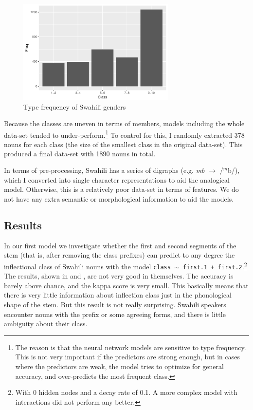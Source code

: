 \begin{figure}
  \centering
  \includegraphics[width=0.7\textwidth]{./figures/swahili/freq-plot.pdf}
  \caption{Type frequency of Swahili genders}\label{fig:class-freq-swahili}
\end{figure}

Because the classes are uneven in terms  of members, models including the whole data-set tended to under-perform.\footnote{The reason is that the neural network models are sensitive to type frequency. This is not very important if the predictors are strong enough, but in cases where the predictors are weak, the model tries to optimize for general accuracy, and over-predicts the most frequent class.} To control for this, I randomly extracted 378 nouns for each class (the size of the smallest class in the original data-set). This produced a final data-set with 1890 nouns in total.

In terms of pre-processing, Swahili has a series of digraphs (e.g. \textit{mb} $\rightarrow$ /$^m$b/), which I converted into single character representations to aid the analogical model. Otherwise, this is a relatively poor data-set in terms of features. We do not have any extra semantic or morphological information to aid the models.

\subsection{Results}

\largerpage
In our first model we investigate whether the first and second segments of the stem (that is, after removing the class prefixes) can predict to any degree the inflectional class of Swahili nouns with the model \texttt{class $\sim$ first.1 + first.2}.\footnote{With 0 hidden nodes and a decay rate of 0.1. A more complex model with interactions did not perform any better.} The results, shown in  and , are not very good in themselves. The accuracy is barely above chance, and the kappa score is very small. This basically means that there is very little information about inflection class just in the phonological shape of the stem. But this result is not really surprising. Swahili speakers encounter nouns with the prefix or some agreeing forms, and there is little ambiguity about their class.

